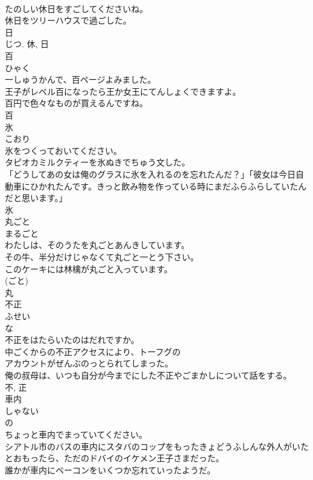 \documentclass[8pt]{extreport}
\begin{document}
\begin{CJK}{UTF8}{min}
\\	たのしい休日をすごしてくださいね。	
\\	休日をツリーハウスで過ごした。	
\\	日 
\\	じつ.	休, 日	
\\	百	
\\	ひゃく	
\\	一しゅうかんで、百ページよみました。	
\\	王子がレベル百になったら王か女王にてんしょくできますよ。	
\\	百円で色々なものが買えるんですね。	
\\	百	
\\	氷	
\\	こおり	
\\	氷をつくっておいてください。	
\\	タピオカミルクティーを氷ぬきでちゅう文した。	
\\	「どうしてあの女は俺のグラスに氷を入れるのを忘れたんだ？」「彼女は今日自動車にひかれたんです。きっと飲み物を作っている時にまだふらふらしていたんだと思います。」	
\\	氷	
\\	丸ごと	
\\	まるごと	
\\	わたしは、そのうたを丸ごとあんきしています。	
\\	その牛、半分だけじゃなくて丸ごと一とう下さい。	
\\	このケーキには林檎が丸ごと入っています。	
\\	(ごと) 
\\	丸	
\\	不正	
\\	ふせい	
\\	な 
\\	不正をはたらいたのはだれですか。	
\\	中ごくからの不正アクセスにより、トーフグの
\\	アカウントがぜんぶのっとられてしまった。	
\\	俺の叔母は、いつも自分が今までにした不正やごまかしについて話をする。	
\\	不, 正	
\\	車内	
\\	しゃない	
\\	の 
\\	ちょっと車内でまっていてください。	
\\	シアトル市のバスの車内にスタバのコップをもったきょどうふしんな外人がいたとおもったら、ただのドバイのイケメン王子さまだった。	
\\	誰かが車内にベーコンをいくつか忘れていったようだ。	

\end{CJK}
\end{document}
